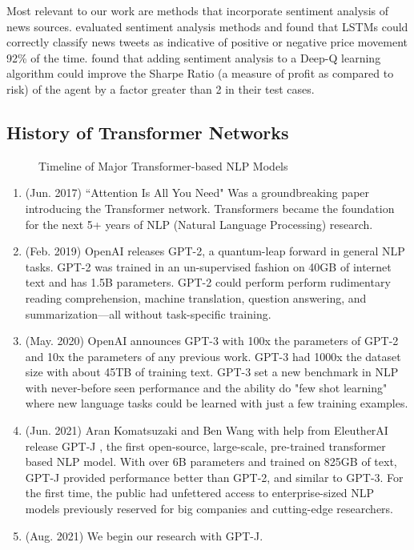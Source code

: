 \documentclass[conference]{IEEEtran}
\begin{document}
Most relevant to our work are methods that incorporate sentiment analysis of news sources. \cite{Mehta2021} evaluated sentiment analysis methods and found that LSTMs could correctly classify news tweets as indicative of positive or negative price movement 92\% of the time. \cite{Nan2020} found that adding sentiment analysis to a Deep-Q learning algorithm could improve the Sharpe Ratio (a measure of profit as compared to risk) of the agent by a factor greater than 2 in their test cases.

\subsection{History of Transformer Networks}
\begin{figure}[ht]
    \caption[Timeline]{Timeline of Major Transformer-based NLP Models}
\end{figure}
\begin{enumerate}
    \item (Jun. 2017) ``Attention Is All You Need" \cite{Vaswani2017} Was a groundbreaking paper introducing the Transformer network. Transformers became the foundation for the next 5+ years of NLP (Natural Language Processing) research.
    \item (Feb. 2019) OpenAI releases GPT-2, a quantum-leap forward in general NLP tasks. GPT-2 was trained in an un-supervised fashion on 40GB of internet text and has 1.5B parameters. GPT-2 could perform perform rudimentary reading comprehension, machine translation, question answering, and summarization—all without task-specific training.
    \item (May. 2020) OpenAI announces GPT-3\cite{Brown2020} with 100x the parameters of GPT-2 and 10x the parameters of any previous work. GPT-3 had 1000x the dataset size with about 45TB of training text. GPT-3 set a new benchmark in NLP with never-before seen performance and the ability do "few shot learning" where new language tasks could be learned with just a few training examples.
    \item (Jun. 2021) Aran Komatsuzaki and Ben Wang with help from EleutherAI release GPT-J \cite{mesh-transformer-jax}, the first open-source, large-scale, pre-trained transformer based NLP model. With over 6B parameters and trained on 825GB of text, GPT-J provided performance better than GPT-2, and similar to GPT-3. For the first time, the public had unfettered access to enterprise-sized NLP models previously reserved for big companies and cutting-edge researchers.
    \item (Aug. 2021) We begin our research with GPT-J.
\end{enumerate}
\end{document}
